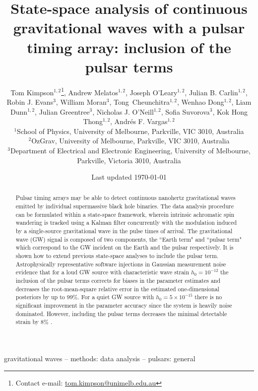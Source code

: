 \documentclass[fleqn,usenatbib,useAMS]{mnras}
\title[State-space PTA]{State-space analysis of continuous gravitational waves with a pulsar timing array: inclusion of the pulsar terms}
\author[Kimpson]{Tom Kimpson$^{1,2}$\thanks{Contact e-mail: \href{tom.kimpson@unimelb.edu.au}{tom.kimpson@unimelb.edu.au}}, Andrew Melatos$^{1,2}$, Joseph O'Leary$^{1,2}$, Julian B. Carlin$^{1,2}$, Robin J. Evans$^{3}$, \newauthor William Moran$^{3}$, Tong Cheunchitra$^{1,2}$, Wenhao Dong$^{1,2}$, Liam Dunn$^{1,2}$, Julian Greentree$^{3}$, Nicholas J. O'Neill$^{1,2}$, \newauthor Sofia Suvorova$^{3}$, Kok Hong Thong$^{1,2}$, Andrés F. Vargas$^{1,2}$%
\\
$^{1}$School of Physics, University of Melbourne, Parkville, VIC 3010, Australia \\
$^{2}$OzGrav, University of Melbourne, Parkville, VIC 3010, Australia \\
$^{3}$Department of Electrical and Electronic Engineering, University of Melbourne, Parkville, Victoria 3010, Australia }
\date{Last updated \today}
\begin{document}
\label{firstpage}
\pagerange{\pageref{firstpage}--\pageref{lastpage}}
\maketitle

\begin{abstract}	
	 Pulsar timing arrays may be able to detect continuous nanohertz gravitational waves emitted by individual supermassive black hole binaries. The data analysis procedure can be formulated within a state-space framework, wherein intrinsic achromatic spin wandering is tracked using a Kalman filter concurrently with the modulation induced by a single-source gravitational wave in the pulse times of arrival. The gravitational wave (GW) signal is composed of two components, the ``Earth term" and ``pulsar term" which correspond to the GW incident on the Earth and the pulsar respectively. It is shown how to extend previous state-space analyses to include the pulsar term. Astrophysically representative software injections in Gaussian measurement noise evidence that for a loud GW source with characteristic wave strain $h_0 = 10^{-12}$ the inclusion of the pulsar terms corrects for biases in the parameter estimates and decreases the root-mean-square relative error in the estimated one-dimensional posteriors by up to 99\%. For a quiet GW source with $h_0 = 5 \times 10^{-15}$ there is no significant improvement in the parameter accuracy since the system is heavily noise dominated. However, including the pulsar terms decreases the minimal detectable strain by $8\%$ .
\end{abstract}

\begin{keywords}
gravitational waves -- methods: data analysis -- pulsars: general
\end{keywords}



\begingroup
\let\clearpage\relax
\endgroup
\newpage
\end{document}
